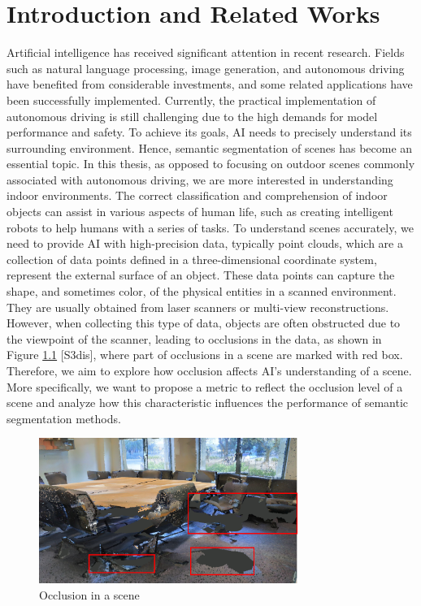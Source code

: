 \documentclass[11pt, a4paper,oneside,chapterprefix=false]{scrbook}
\begin{document}
\chapter{Introduction and Related Works} \label{chp:introduction}


Artificial intelligence has received significant attention in recent research. Fields such as natural language processing, image generation, and autonomous driving have benefited from considerable investments, and some related applications have been successfully implemented. Currently, the practical implementation of autonomous driving is still challenging due to the high demands for model performance and safety. To achieve its goals, AI needs to precisely understand its surrounding environment. Hence, semantic segmentation of scenes has become an essential topic. In this thesis, as opposed to focusing on outdoor scenes commonly associated with autonomous driving, we are more interested in understanding indoor environments. The correct classification and comprehension of indoor objects can assist in various aspects of human life, such as creating intelligent robots to help humans with a series of tasks. To understand scenes accurately, we need to provide AI with high-precision data, typically point clouds, which are a collection of data points defined in a three-dimensional coordinate system, represent the external surface of an object. These data points can capture the shape, and sometimes color, of the physical entities in a scanned environment. They are usually obtained from laser scanners or multi-view reconstructions. However, when collecting this type of data, objects are often obstructed due to the viewpoint of the scanner, leading to occlusions in the data, as shown in Figure \ref{fig:occlusion in a scene} [S3dis], where part of occlusions in a scene are marked with red box. Therefore, we aim to explore how occlusion affects AI's understanding of a scene. More specifically, we want to propose a metric to reflect the occlusion level of a scene and analyze how this characteristic influences the performance of semantic segmentation methods.


\begin{figure}[h]
    \centering
    \includegraphics*[width=0.75\textwidth]{figures/occlusion in conf2.png}
    \caption{Occlusion in a scene}
    \label{fig:occlusion in a scene}
\end{figure}
\end{document}

